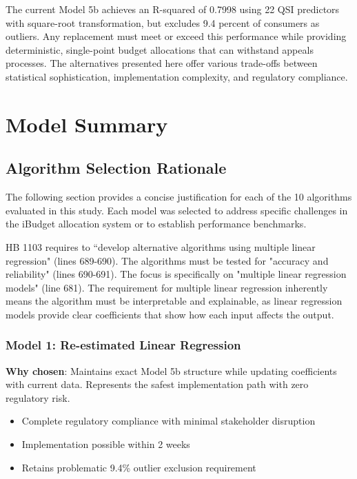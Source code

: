 The current Model 5b achieves an R-squared of 0.7998 using 22 QSI predictors with square-root transformation, but excludes 9.4 percent of consumers as outliers. Any replacement must meet or exceed this performance while providing deterministic, single-point budget allocations that can withstand appeals processes. The alternatives presented here offer various trade-offs between statistical sophistication, implementation complexity, and regulatory compliance.

\section{Model Summary}

\subsection{Algorithm Selection Rationale}

The following section provides a concise justification for each of the 10 algorithms evaluated in this study. Each model was selected to address specific challenges in the iBudget allocation system or to establish performance benchmarks.

HB 1103  requires to ``develop alternative algorithms using multiple linear regression" (lines 689-690). The algorithms must be tested for "accuracy and reliability" (lines 690-691). The focus is specifically on "multiple linear regression models" (line 681). The requirement for multiple linear regression inherently means the algorithm must be interpretable and explainable, as linear regression models provide clear coefficients that show how each input affects the output.

\subsubsection{Model 1: Re-estimated Linear Regression}
\textbf{Why chosen}: Maintains exact Model 5b structure while updating coefficients with current data. Represents the safest implementation path with zero regulatory risk.
\begin{itemize}
    \item Complete regulatory compliance with minimal stakeholder disruption
    \item Implementation possible within 2 weeks
    \item Retains problematic 9.4\% outlier exclusion requirement
\end{itemize}

